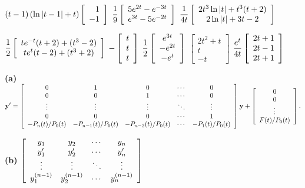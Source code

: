 \smallskip

$\displaystyle{(t-1)\left(\ln|t-1|+t\right)\left[\begin{array}{r}1\\-1
\end{array}\right]}$
$\displaystyle{\frac{1}{9}\left[\begin{array}{c}5e^{2t}-e^{-3t}\\e^{3t}-5e^{-2t}
\end{array}\right]}$
$\displaystyle{\frac{1}{4t}\left[\begin{array}{c}2t^{3}\ln|t|+t^{3}(t+2)\\
2\ln|t|+3t-2
\end{array}\right]}$

\smallskip

$\displaystyle{\frac{1}{2}\left[\begin{array}{c}te^{-t}(t+2)+(t^{3}-2)\\
te^{t}(t-2)+(t^{3}+2)
\end{array}\right]}$
 $\displaystyle{-\left[\begin{array}{c}t\\t\\t
\end{array}\right]}$
$\displaystyle{\frac{1}{2}\left[\begin{array}{c}e^{3t}\\-e^{2t}\\-e^{t}\end{array}\right]}$
$\left[\begin{array}{cccc}2t^{2}+t\\t\\-t\end{array}\right]$
$\displaystyle{\frac{e^{t}}{4t}\left[\begin{array}{c}2t+1\\2t-1\\2t+1
\end{array}\right]}$

 {\bf (a)} $\displaystyle{{\bf y}'=
\left[\begin{array}{ccccc}0&1&0&\cdots&0\\0&0&1&\cdots&0\\
\vdots&\vdots&\vdots&\ddots&\vdots\\0&0&0&\cdots&1\\
-P_{n}(t)/P_{0}(t)&-P_{n-1}(t)/P_{0}(t)&-P_{n-2}(t)/P_{0}(t)&
\cdots&-P_{1}(t)/P_{0}(t)\end{array}\right]{\bf y}+
\left[\begin{array}{c}0\\0\\\vdots\\F(t)/P_{0}(t)\end{array}\right].}$

{\bf (b)} ${\displaystyle{\left[\begin{array}{cccc}
y_{1}&y_{2}&\cdots&y_{n}\\y_{1}'&y_{2}'&\cdots&y_{n}'\\
\vdots&\vdots&\ddots&\vdots\\y_{1}^{(n-1)}&y_{2}^{(n-1)}&\cdots&y_{n}^{(n-1)}
\end{array}\right]}}$

